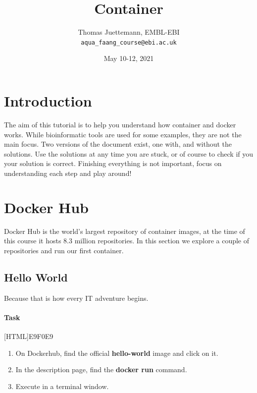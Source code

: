 \documentclass[12pt]{article}
\begin{document}
	
	\title{Container} 
	\author{Thomas Juettemann, EMBL-EBI\\
	\texttt{aqua\_faang\_course@ebi.ac.uk}}  %
	\date{May 10-12, 2021}  %
	\maketitle
	

	\section{Introduction}
		The aim of this tutorial is to help you understand how container and docker works.
		While bioinformatic tools are used for some examples, they are not the main focus.
		Two versions of the document exist, one with, and without the solutions.
		Use the solutions at any time you are stuck, or of course to check if you your solution is correct.
		Finishing everything is not important, focus on understanding each step and play around! 
		
	
	
	\section{Docker Hub}
		Docker Hub is the world’s largest repository of container images, at the time of this course it hosts 8.3 million repositories. 
		In this section we explore a couple of repositories and run our first container.
	
		\subsection{Hello World}
			Because that is how every IT adventure begins.
			
			
			\paragraph{Task}
				[HTML]{E9F0E9}{\parbox{\linewidth}{%
						\begin{enumerate}
							\item On Dockerhub, find the official  \textbf{hello-world} image and click on it.
							\item In the description page, find the \textbf{docker run } command.
							\item Execute  in a terminal window.
						\end{enumerate}
				}}
			
\end{document}
